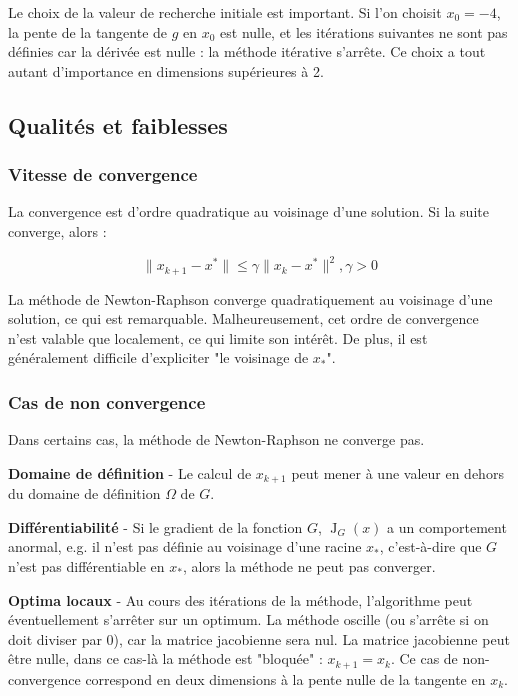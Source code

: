 \documentclass[3p, twocolumn]{elsarticle}
\DeclareMathOperator{\Jacobian}{J}
\begin{document}
\begin{rmk}
    Le choix de la valeur de recherche initiale est important. Si l'on choisit $x_0=-4$, la pente de la tangente de $g$ en $x_0$ est nulle, et les itérations suivantes ne sont pas définies car la dérivée est nulle : la méthode itérative s'arrête. Ce choix a tout autant d'importance en dimensions supérieures à 2.
\end{rmk}


\subsection{Qualités et faiblesses}
\subsubsection{Vitesse de convergence}
La convergence est d'ordre quadratique au voisinage d'une solution. Si la suite converge, alors :

\begin{equation*}
    \lVert x_{k+1}-x^{*}\rVert \leq \gamma\lVert x_{k}- x^{*}\rVert^{2}, \gamma >0
    \label{eq:convergence-nr}
\end{equation*}

La méthode de Newton-Raphson converge quadratiquement au voisinage d'une solution, ce qui est remarquable. Malheureusement, cet ordre de convergence n'est valable que localement, ce qui limite son intérêt. De plus, il est généralement difficile d'expliciter "le voisinage de $x_*$".

\subsubsection{Cas de non convergence}
Dans certains cas, la méthode de Newton-Raphson ne converge pas.

\textbf{Domaine de définition} - Le calcul de $x_{k+1}$ peut mener à une valeur en dehors du domaine de définition $\Omega$ de $G$.

\textbf{Différentiabilité} - Si le gradient de la fonction $G$, $\Jacobian_G(x)$ a un comportement anormal, e.g. il n'est pas définie au voisinage d'une racine $x_*$, c'est-à-dire que $G$ n'est pas différentiable en $x_*$, alors la méthode ne peut pas converger.

\textbf{Optima locaux} - Au cours des itérations de la méthode, l'algorithme peut éventuellement s'arrêter sur un optimum. La méthode oscille (ou s'arrête si on doit diviser par 0), car la matrice jacobienne sera nul. La matrice jacobienne peut être nulle, dans ce cas-là la méthode est "bloquée" : $x_{k+1} = x_k$. Ce cas de non-convergence correspond en deux dimensions à la pente nulle de la tangente en $x_k$.
\end{document}
